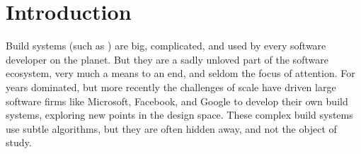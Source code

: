 \section{Introduction}\label{sec-intro}

Build systems (such as \Make) are big, complicated, and used by every
software developer on the planet.  But they are a sadly unloved part
of the software ecosystem, very much a means to an end, and seldom the
focus of attention.
For years \Make dominated, but more recently the challenges of scale have driven
large software firms like Microsoft, Facebook, and Google to develop their own
build systems, exploring new points in the design space. These complex build
systems use subtle algorithms, but they are often hidden away, and not the
object of study.

